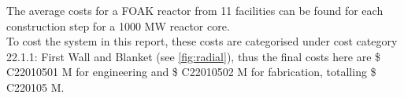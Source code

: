 The average costs for a FOAK reactor from 11 facilities can be found for each construction step for a 1000 MW reactor core.\\

To cost the system in this report, these costs are categorised under cost category 22.1.1: First Wall and Blanket (see \ref{fig:radial}), thus the final costs here are \$ C22010501 M for engineering and \$ C22010502 M for fabrication, totalling \$ C220105 M.

